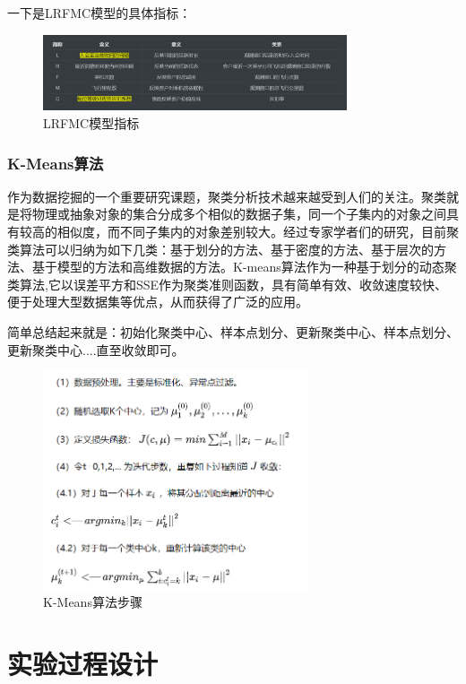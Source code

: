 \documentclass[UTF8,12pt]{article}
\begin{document}
一下是LRFMC模型的具体指标：
\begin{figure}[htbp]
    \centering
    \includegraphics[width=0.8\textwidth]{img/2.png}
    \caption{LRFMC模型指标}
\end{figure}

\subsubsection{K-Means算法}
作为数据挖掘的一个重要研究课题，聚类分析技术越来越受到人们的关注。聚类就是将物理或抽象对象的集合分成多个相似的数据子集，同一个子集内的对象之间具有较高的相似度，而不同子集内的对象差别较大。经过专家学者们的研究，目前聚类算法可以归纳为如下几类：基于划分的方法、基于密度的方法、基于层次的方法、基于模型的方法和高维数据的方法。K-means算法作为一种基于划分的动态聚类算法,它以误差平方和SSE作为聚类准则函数，具有简单有效、收敛速度较快、便于处理大型数据集等优点，从而获得了广泛的应用。

简单总结起来就是：初始化聚类中心、样本点划分、更新聚类中心、样本点划分、更新聚类中心....直至收敛即可。

\begin{figure}[htbp]
    \centering
    \includegraphics[width=0.7\textwidth]{img/3.png}
    \caption{K-Means算法步骤}
\end{figure}

\section{实验过程设计}
\end{document}
